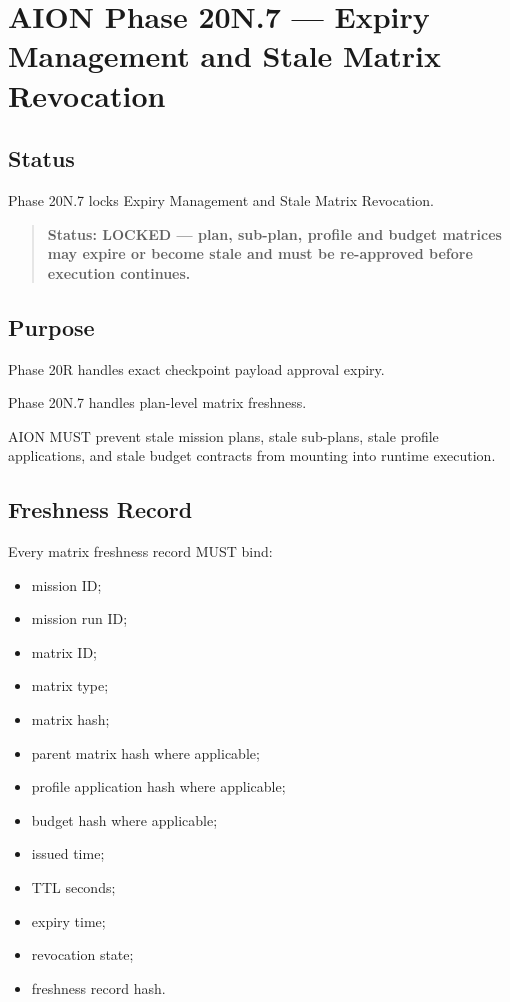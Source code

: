 \section{AION Phase 20N.7 --- Expiry Management and Stale Matrix Revocation}
\label{sec:aion-phase20n7-expiry-management-stale-matrix-revocation}

\subsection{Status}

Phase 20N.7 locks Expiry Management and Stale Matrix Revocation.

\begin{quote}
\textbf{Status: LOCKED --- plan, sub-plan, profile and budget matrices may expire or become stale and must be re-approved before execution continues.}
\end{quote}

\subsection{Purpose}

Phase 20R handles exact checkpoint payload approval expiry.

Phase 20N.7 handles plan-level matrix freshness.

AION MUST prevent stale mission plans, stale sub-plans, stale profile applications, and stale budget contracts from mounting into runtime execution.

\subsection{Freshness Record}

Every matrix freshness record MUST bind:

\begin{itemize}
  \item mission ID;
  \item mission run ID;
  \item matrix ID;
  \item matrix type;
  \item matrix hash;
  \item parent matrix hash where applicable;
  \item profile application hash where applicable;
  \item budget hash where applicable;
  \item issued time;
  \item TTL seconds;
  \item expiry time;
  \item revocation state;
  \item freshness record hash.
\end{itemize}


